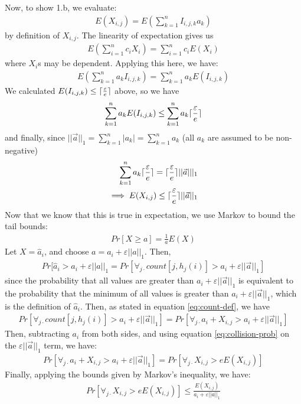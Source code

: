 \documentclass[11pt]{article}
\DeclarePairedDelimiter\ceil{\lceil}{\rceil}
\begin{document}
Now, to show 1.b, we evaluate:
\begin{align}
    E(X_{i, j}) = E\left(\sum_{k = 1}^n I_{i, j, k} a_k\right) 
\end{align}
by definition of $X_{i, j}$. The linearity of expectation gives us
\begin{align}
    E(\sum_{i = 1}^{n} c_i X_i) = \sum_{i = 1}^{n} c_i E(X_i)
\end{align}
where $X_i$s may be dependent. Applying this here, we have:
\begin{align}
    E(\sum_{k = 1}^{n} a_k I_{i, j, k}) = \sum_{k = 1}^{n} a_k E(I_{i, j, k}) 
\end{align}
We calculated $E(I_{i, j, k}) \leq \ceil{\frac{\varepsilon}{e}}$ above, so 
we have
\begin{align}
    \sum_{k = 1}^{n} a_k E(I_{i, j, k})  \leq\sum_{k = 1}^{n} a_k \ceil{\frac{\varepsilon}{e}}
\end{align}
and finally, since $||\vec{a}||_1 = \sum_{k = 1}^{n} |a_k| = \sum_{k = 1}^{n} a_k$
(all $a_k$ are assumed to be non-negative)
\begin{align}
    \sum_{k = 1}^{n} a_k \ceil{\frac{\varepsilon}{e}} = \ceil{\frac{\varepsilon}{e}} ||\vec{a}|||_1 \\
    \implies E(X_{i, j}) \leq \ceil{\frac{\varepsilon}{e}} ||\vec{a}||_1
\end{align}
Now that we know that this is true in expectation, we use Markov to bound the tail bounds:
\begin{align}
    Pr[X \geq a] = \frac{1}{a}E(X) 
\end{align}
Let $X = \hat{a}_i$, and choose $a = a_i + \varepsilon||a||_1$.  Then,
\begin{align}
    Pr[\hat{a}_i > a_i + \varepsilon ||a||_1 = Pr[\forall_{j \cdot} count[j, h_j(i)] > a_i + \varepsilon ||\vec{a}||_1] 
\end{align}
since the probability that all values are greater than $a_i + \varepsilon||\vec a||_1$ is equivalent 
to the probability that the minimum of all values is greater than $a_i + \varepsilon||\vec a||_1$,
which is the definition of $\hat a_i$. Then, as stated in equation \ref{eq:count-def}, we have
\begin{align}
    Pr[\forall_{j \cdot} count[j, h_j(i)] > a_i + \varepsilon ||\vec{a}||_1] = Pr[\forall_{j \cdot} a_i + X_{i, j} > a_i + \varepsilon ||\vec{a}||_1]
\end{align}
Then, subtracting $a_i$ from both sides, and using equation \ref{eq:collision-prob} on the $\varepsilon ||\vec{a}||_1$ term, we have:
\begin{align}
    Pr[\forall_{j \cdot} a_i + X_{i, j} > a_i + \varepsilon ||\vec{a}||_1]  = Pr[\forall_{j \cdot} X_{i, j} > e E(X_{i, j})]
\end{align}
Finally, applying the bounds given by Markov's inequality, we have:
\begin{align}
      Pr[\forall_{j \cdot} X_{i, j} > e E(X_{i, j})] \leq \frac{E(X_{i, j})}{a_i + \varepsilon||a||_1} 
\end{align}
\end{document}

